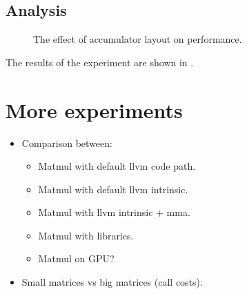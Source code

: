 \documentclass[\main/thesis.tex]{subfiles}
\begin{document}
\subsection{Analysis}
\begin{figure}[t]
  \centering
  
  \caption{The effect of accumulator layout on performance.}
  \label{fig:tightAccLayout}
\end{figure}

The results of the experiment are shown in .

\section{More experiments}
\begin{itemize}
  \item Comparison between:
  \begin{itemize}
    \item Matmul with default llvm code path.
    \item Matmul with default llvm intrinsic.
    \item Matmul with llvm intrinsic + mma.
    \item Matmul with libraries.
    \item Matmul on GPU?
  \end{itemize}
\end{itemize}

\begin{itemize}
  \item Small matrices vs big matrices (call costs).
\end{itemize}
\end{document}
